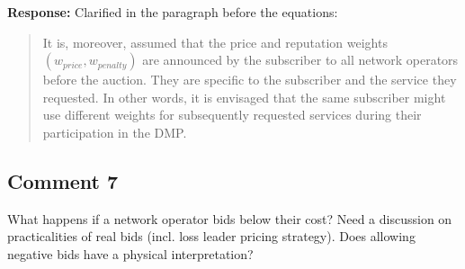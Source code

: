 \documentclass[10pt,a4paper,notitlepage]{article}
\numberwithin{equation}{section}
\begin{document}
\textbf{Response:}
Clarified in the paragraph before the equations:
\begin{quote}
It is, moreover, assumed that the price and reputation weights $(w_{price}, w_{penalty})$ are announced by the subscriber to all network operators before the auction. They are specific to the subscriber and the service they requested. In other words, it is envisaged that the same subscriber might use different weights for subsequently requested services during their participation in the DMP.
\end{quote}

\subsection{Comment 7}
What happens if a network operator bids below their cost? Need a discussion on practicalities of real bids (incl. loss leader pricing strategy). Does allowing negative bids have a physical interpretation?\\[-2ex]
\end{document}
